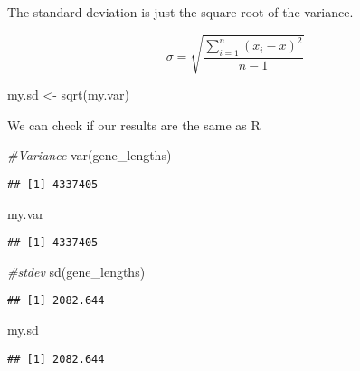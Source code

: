 \documentclass[
]{book}
\newenvironment{Shaded}{\begin{snugshade}}{\end{snugshade}}
\newcommand{\CommentTok}[1]{\textcolor[rgb]{0.56,0.35,0.01}{\textit{#1}}}
\newcommand{\FunctionTok}[1]{\textcolor[rgb]{0.00,0.00,0.00}{#1}}
\newcommand{\NormalTok}[1]{#1}
\newcommand{\OtherTok}[1]{\textcolor[rgb]{0.56,0.35,0.01}{#1}}
\begin{document}
The standard deviation is just the square root of the variance.

\[\sigma = \sqrt{\frac{\sum\limits_{i=1}^{n} \left(x_{i} - \bar{x}\right)^{2}} {n-1}}\]

\begin{Shaded}
\begin{Highlighting}[]
\NormalTok{my.sd }\OtherTok{\textless{}{-}} \FunctionTok{sqrt}\NormalTok{(my.var)}
\end{Highlighting}
\end{Shaded}

We can check if our results are the same as R

\begin{Shaded}
\begin{Highlighting}[]
\CommentTok{\#Variance}
\FunctionTok{var}\NormalTok{(gene\_lengths)}
\end{Highlighting}
\end{Shaded}

\begin{verbatim}
## [1] 4337405
\end{verbatim}

\begin{Shaded}
\begin{Highlighting}[]
\NormalTok{my.var}
\end{Highlighting}
\end{Shaded}

\begin{verbatim}
## [1] 4337405
\end{verbatim}

\begin{Shaded}
\begin{Highlighting}[]
\CommentTok{\#stdev}
\FunctionTok{sd}\NormalTok{(gene\_lengths)}
\end{Highlighting}
\end{Shaded}

\begin{verbatim}
## [1] 2082.644
\end{verbatim}

\begin{Shaded}
\begin{Highlighting}[]
\NormalTok{my.sd}
\end{Highlighting}
\end{Shaded}

\begin{verbatim}
## [1] 2082.644
\end{verbatim}
\end{document}
